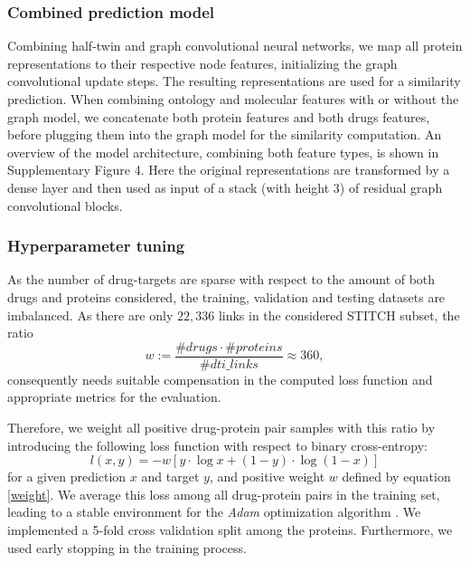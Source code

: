 \documentclass{bioinfo}
\begin{document}

\subsubsection{Combined prediction model}
Combining half-twin and graph convolutional neural networks, we map
all protein representations to their respective node features,
initializing the graph convolutional update steps. The resulting
representations are used for a similarity prediction.
When combining ontology and molecular features with or without the
graph model, we concatenate both protein features and both drugs
features, before plugging them into the graph model for the similarity
computation.  An overview of the model architecture, combining both
feature types, is shown in Supplementary Figure 4.  Here the original
representations are transformed by a dense layer and then used as
input of a stack (with height 3) of residual graph convolutional
blocks. %

\subsubsection{Hyperparameter tuning}
As the number of drug-targets are sparse with respect to the amount of
both drugs and proteins considered, the training, validation and
testing datasets are imbalanced. As there are only $22,336$ links in
the considered STITCH subset, the ratio
\begin{equation}
  w:= \frac{\#drugs \cdot \#proteins}{\#dti\_links} \approx 360,
  \label{weight}
\end{equation}
consequently needs suitable compensation in the computed loss function and
appropriate metrics for the evaluation.

Therefore, we weight all positive drug-protein pair samples with this
ratio by introducing the following loss function with respect to 
binary cross-entropy:
\begin{equation}
  l(x,y) = - w \left[ y \cdot \log x + (1 - y) \cdot \log (1 - x) \right]
\end{equation}
for a given prediction $x$ and target $y$, and positive weight $w$
defined by equation \eqref{weight}. We average this loss among all
drug-protein pairs in the training set, leading to a stable
environment for the \textit{Adam} optimization algorithm
\citep{Adam2014}. We implemented a 5-fold cross validation split among
the proteins. Furthermore, we used early stopping in the training
process.
\end{document}

